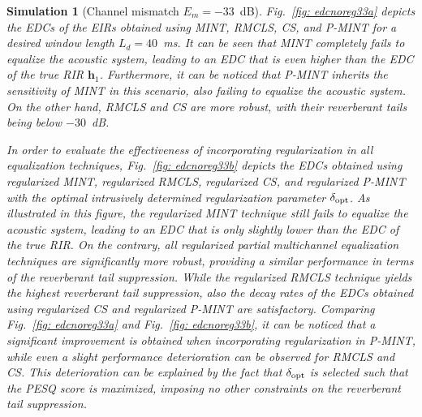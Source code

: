 \documentclass[draftcls,onecolumn,11pt]{IEEEtran}
\newtheorem{simulation}{Simulation}
\begin{document}
\begin{simulation}[Channel mismatch $E_m=-33$~dB]
\label{sim1} 
Fig.~\ref{fig: edcnoreg33a} depicts the EDCs of the EIRs obtained using MINT, RMCLS, CS, and P-MINT for a desired window length $L_d = 40$~ms.
It can be seen that MINT completely fails to equalize the acoustic system, leading to an EDC that is even higher than the EDC of the true RIR $\mathbf{h}_1$.
Furthermore, it can be noticed that P-MINT inherits the sensitivity of MINT in this scenario, also failing to equalize the acoustic system.
On the other hand, RMCLS and CS are more robust, with their reverberant tails being below $-30$~dB.

In order to evaluate the effectiveness of incorporating regularization in all equalization techniques, Fig.~\ref{fig: edcnoreg33b} depicts the EDCs obtained using regularized MINT, regularized RMCLS, regularized CS, and regularized P-MINT with the optimal intrusively determined regularization parameter $\delta_{\rm opt}$.
As illustrated in this figure, the regularized MINT technique still fails to equalize the acoustic system, leading to an EDC that is only slightly lower than the EDC of the true RIR.
On the contrary, all regularized partial multichannel equalization techniques are significantly more robust, providing a similar performance in terms of the reverberant tail suppression.
While the regularized RMCLS technique yields the highest reverberant tail suppression, also the decay rates of the EDCs obtained using regularized CS and regularized P-MINT are satisfactory.
Comparing Fig.~\ref{fig: edcnoreg33a} and Fig.~\ref{fig: edcnoreg33b}, it can be noticed that a significant improvement is obtained when incorporating regularization in P-MINT, while even a slight performance deterioration can be observed for RMCLS and CS.
This deterioration can be explained by the fact that $\delta_{\rm opt}$ is selected such that the PESQ score is maximized, imposing no other constraints on the reverberant tail suppression.


\end{simulation}
\end{document}
